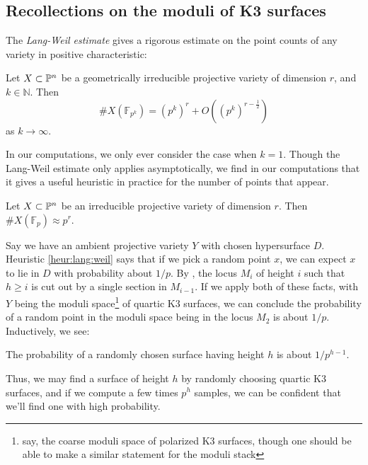 \subsection{Recollections on the moduli of K3 surfaces}

The \textit{Lang-Weil estimate} gives a rigorous estimate
on the point counts of any variety in positive characteristic:

\begin{thm}
	Let \(X \subset \mathbb{P}^{n}\)
	be a geometrically irreducible projective variety of dimension \(r\), and \(k \in \mathbb{N}\).
	Then 
	\[
		\#X(\mathbb{F}_{p^{k}}) = (p^{k})^r + O((p^{k})^{r - \frac{1}{2}})
	\] 
    as \(k \xrightarrow{} \infty\).
\end{thm}

In our computations, we only ever consider the case when
\(k=1\). Though the Lang-Weil estimate only applies 
asymptotically, we find in our computations that it gives a useful heuristic in practice
for the number of points that appear.

\begin{heur}
    \label{heur:lang:weil}
    Let \(X \subset \mathbb{P}^{n}\) 
    be an irreducible projective variety of dimension \(r\).
    Then \(\#X(\mathbb{F}_{p}) \approx p^{r}\).
\end{heur}

Say we have an ambient projective variety
\(Y\) with chosen
hypersurface \(D\).
Heuristic \ref{heur:lang:weil} 
says that if we pick a random point \(x\),
we can expect \(x\) to lie in \(D\) 
with probability about \(1 / p\).
By \cite[Section~7]{artin-1974-k3-surfaces}, 
the locus \(M_{i}\) of height \(i\) such that \(h \geq i\)
is cut out by a single section in 
\(M_{i-1}\).
If we apply both of these facts,
with \(Y\) being the 
moduli space\footnote{
	say, the coarse moduli space of polarized K3 surfaces,
	though one should be able to make a similar statement
	for the moduli stack
} of quartic K3 surfaces,
we can conclude 
the probability of a random point 
in the moduli space being in the locus
\(M_{2}\) is about \(1 / p\). 
Inductively, we see:

\begin{heur}
The probability of a randomly
chosen surface having height \(h\) is about \(1 / p^{h-1}\).
\end{heur}

Thus, we may find a surface of height \(h\) by 
randomly choosing quartic K3 surfaces, and 
if we compute a few times \(p^{h}\) 
samples, we can be confident that we'll find
one with high probability.

